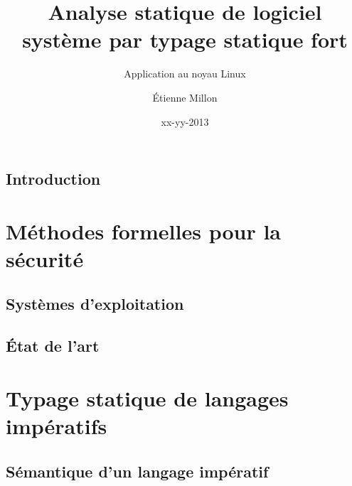 \documentclass[a4paper,11pt]{memoir}
\title{Analyse statique de logiciel système par typage statique fort}
\subtitle{Application au noyau Linux}
\author{Étienne Millon}
\date{xx-yy-2013}
\begin{document}
\frontmatter

\begin{titlingpage}
\titleUL{}
\end{titlingpage}

\cleartorecto

\asuabstract



\asuacknowledgements




\tableofcontents

\mainmatter

\chapter{Introduction}


\part{Méthodes formelles pour la sécurité}

\chapter{Systèmes d'exploitation}

\label{cha:os}



%

\chapter{État de l'art}



\part{Typage statique de langages impératifs}

\chapter{Sémantique d'un langage impératif}

\label{cha:lang}

\end{document}
